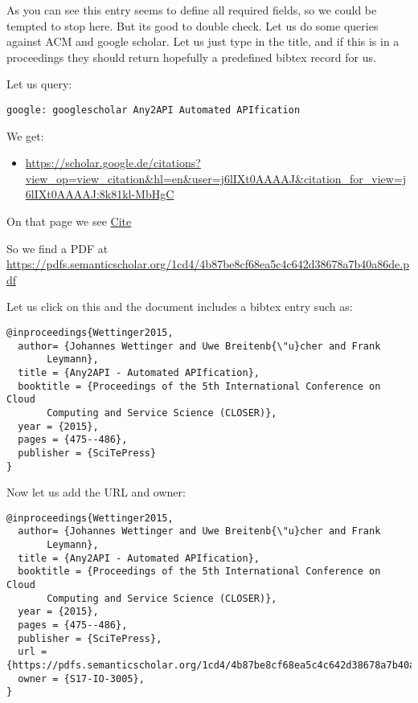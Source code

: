 As you can see this entry seems to define all required fields, so we
could be tempted to stop here. But its good to double check. Let us do
some queries against ACM and google scholar. Let us just type in the
title, and if this is in a proceedings they should return hopefully a
predefined bibtex record for us.

Let us query:

\begin{verbatim}
google: googlescholar Any2API Automated APIfication
\end{verbatim}

We get:

\begin{itemize}

\item
  \url{https://scholar.google.de/citations?view_op=view_citation\&hl=en\&user=j6lIXt0AAAAJ\&citation_for_view=j6lIXt0AAAAJ:8k81kl-MbHgC}
\end{itemize}

On that page we see
\href{https://scholar.google.com/scholar_lookup?title=Automated+drug+dispensing+system+reduces+medication+errors+in+an+intensive+care+setting\&author=Chapuis\&publication_year=2010\#}{Cite}

So we find a PDF at
\url{https://pdfs.semanticscholar.org/1cd4/4b87be8cf68ea5c4c642d38678a7b40a86de.pdf}

Let us click on this and the document includes a bibtex entry such as:

\begin{verbatim}
@inproceedings{Wettinger2015, 
  author= {Johannes Wettinger and Uwe Breitenb{\"u}cher and Frank
       Leymann},
  title = {Any2API - Automated APIfication},
  booktitle = {Proceedings of the 5th International Conference on Cloud
       Computing and Service Science (CLOSER)},
  year = {2015},
  pages = {475--486},
  publisher = {SciTePress}
} 
\end{verbatim}

Now let us add the URL and owner:

\begin{verbatim}
@inproceedings{Wettinger2015, 
  author= {Johannes Wettinger and Uwe Breitenb{\"u}cher and Frank
       Leymann},
  title = {Any2API - Automated APIfication},
  booktitle = {Proceedings of the 5th International Conference on Cloud
       Computing and Service Science (CLOSER)},
  year = {2015},
  pages = {475--486},
  publisher = {SciTePress},
  url ={https://pdfs.semanticscholar.org/1cd4/4b87be8cf68ea5c4c642d38678a7b40a86de.pdf},
  owner = {S17-IO-3005},
} 
\end{verbatim}

